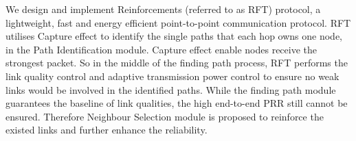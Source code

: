 \documentclass[conference]{IEEEtran}
\begin{document}
We design and implement Reinforcements (referred to as RFT) protocol, a lightweight, fast and energy efficient point-to-point communication protocol. RFT utilises Capture effect to identify the single paths that each hop owns one node, in the Path Identification module. Capture effect enable nodes receive the strongest packet. So in the middle of the finding path process, RFT performs the link quality control and adaptive transmission power control to ensure no weak links would be involved in the identified paths. While the finding path module guarantees the baseline of link qualities, the high end-to-end PRR still cannot be ensured. Therefore Neighbour Selection module is proposed to reinforce the existed links and further enhance the reliability. %

\end{document}
